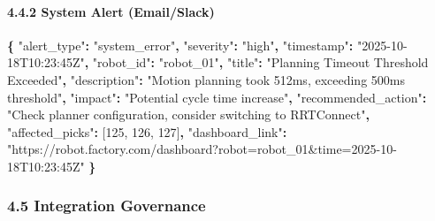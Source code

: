 \documentclass[
]{article}
\newenvironment{Shaded}{\begin{snugshade}}{\end{snugshade}}
\newcommand{\DataTypeTok}[1]{\textcolor[rgb]{0.13,0.29,0.53}{#1}}
\newcommand{\DecValTok}[1]{\textcolor[rgb]{0.00,0.00,0.81}{#1}}
\newcommand{\FunctionTok}[1]{\textcolor[rgb]{0.13,0.29,0.53}{\textbf{#1}}}
\newcommand{\OtherTok}[1]{\textcolor[rgb]{0.56,0.35,0.01}{#1}}
\newcommand{\StringTok}[1]{\textcolor[rgb]{0.31,0.60,0.02}{#1}}
\begin{document}
\hypertarget{system-alert-emailslack}{%
\paragraph{4.4.2 System Alert
(Email/Slack)}\label{system-alert-emailslack}}

\begin{Shaded}
\begin{Highlighting}[]
\FunctionTok{\{}
  \DataTypeTok{"alert\_type"}\FunctionTok{:} \StringTok{"system\_error"}\FunctionTok{,}
  \DataTypeTok{"severity"}\FunctionTok{:} \StringTok{"high"}\FunctionTok{,}
  \DataTypeTok{"timestamp"}\FunctionTok{:} \StringTok{"2025{-}10{-}18T10:23:45Z"}\FunctionTok{,}
  \DataTypeTok{"robot\_id"}\FunctionTok{:} \StringTok{"robot\_01"}\FunctionTok{,}
  \DataTypeTok{"title"}\FunctionTok{:} \StringTok{"Planning Timeout Threshold Exceeded"}\FunctionTok{,}
  \DataTypeTok{"description"}\FunctionTok{:} \StringTok{"Motion planning took 512ms, exceeding 500ms threshold"}\FunctionTok{,}
  \DataTypeTok{"impact"}\FunctionTok{:} \StringTok{"Potential cycle time increase"}\FunctionTok{,}
  \DataTypeTok{"recommended\_action"}\FunctionTok{:} \StringTok{"Check planner configuration, consider switching to RRTConnect"}\FunctionTok{,}
  \DataTypeTok{"affected\_picks"}\FunctionTok{:} \OtherTok{[}\DecValTok{125}\OtherTok{,} \DecValTok{126}\OtherTok{,} \DecValTok{127}\OtherTok{]}\FunctionTok{,}
  \DataTypeTok{"dashboard\_link"}\FunctionTok{:} \StringTok{"https://robot.factory.com/dashboard?robot=robot\_01\&time=2025{-}10{-}18T10:23:45Z"}
\FunctionTok{\}}
\end{Highlighting}
\end{Shaded}

\hypertarget{integration-governance}{%
\subsubsection{4.5 Integration
Governance}\label{integration-governance}}
\end{document}
